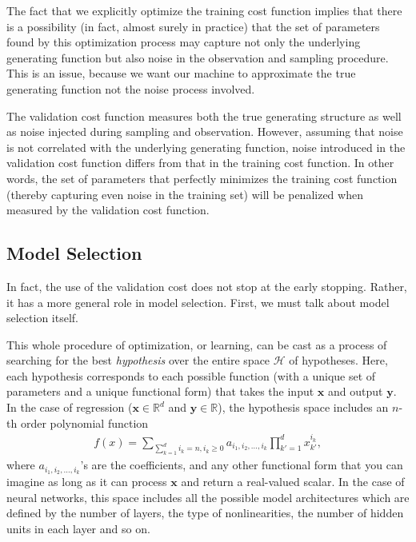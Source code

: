 \documentclass{report}
\newcommand{\vect}[1]{\mathbf{#1}}
\newcommand{\vx}[0]{\vect{x}}
\newcommand{\vy}[0]{\vect{y}}
\newcommand{\HH}[0]{\mathcal{H}}
\newcommand{\RR}[0]{\mathbb{R}}
\begin{document}
The fact that we explicitly optimize the training cost function implies that
there is a possibility (in fact, almost surely in practice) that the set of
parameters found by this optimization process may capture not only the
underlying generating function but also noise in the observation and sampling
procedure. This is an issue, because we want our machine to approximate the true
generating function not the noise process involved. 

The validation cost function measures both the true generating structure as well
as noise injected during sampling and observation. However, assuming that noise
is not correlated with the underlying generating function, noise introduced in
the validation cost function differs from that in the training cost function. In
other words, the set of parameters that perfectly minimizes the training cost
function (thereby capturing even noise in the training set) will be penalized
when measured by the validation cost function. 

\subsection{Model Selection}
\label{sec:hypothesis_space}

In fact, the use of the validation cost does not stop at the early stopping.
Rather, it has a more general role in model selection. First, we must talk about
model selection itself.

This whole procedure of optimization, or learning, can be cast as a process of
searching for the best {\em hypothesis} over the entire space $\HH$ of
hypotheses.  Here, each hypothesis corresponds to each possible function (with a
unique set of parameters and a unique functional form) that takes the input
$\vx$ and output $\vy$. In the case of regression ($\vx \in \RR^d$ and $\vy \in
\RR$), the hypothesis space includes an $n$-th order polynomial function 
\begin{align*}
    f(x) = \sum_{\sum_{k=1}^d i_k = n, i_k \geq 0}
    a_{i_1,i_2,\ldots,i_k} \prod_{k'=1}^d x_{k'}^{i_k},
\end{align*}
where $a_{i_1,i_2,\ldots,i_k}$'s are the coefficients, and 
any other functional form that you can imagine as long as it can process $\vx$
and return a real-valued scalar.  In the case of neural networks, this space
includes all the possible model architectures which are defined by the number of
layers, the type of nonlinearities, the number of hidden units in each layer and
so on. 
\end{document}
